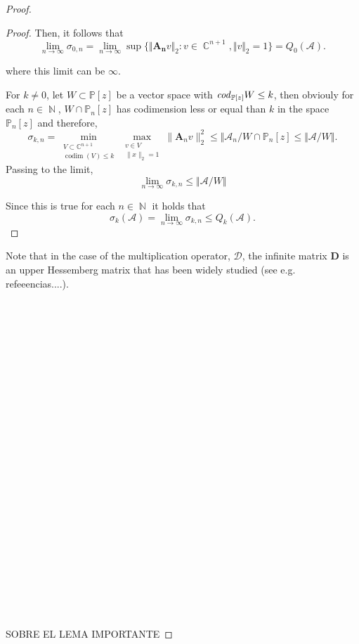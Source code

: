 \documentclass[12pt]{amsart}
\theoremstyle{definition}
\theoremstyle{plain}
\theoremstyle{remark}
\DeclareMathOperator{\CC}{\mathbb C}
\DeclareMathOperator{\NN}{\mathbb N}
\begin{document}
\begin{proof}
\begin{proof}
\noindent Then, it follows that 
$$
\lim_{n\to \infty} \sigma_{0,n}= 
\lim_{n\to \infty} \sup \{ \Vert \mathbf{A_n}v\Vert_2: v\in \CC^{n+1}, \Vert v \Vert_2=1\} =Q_0(\mathcal{A}). 
$$

\noindent where this limit can be $\infty$. 

\noindent For $k\neq 0$, let $W\subset \mathbb{P}[z]$ be a vector space with ${\it cod}_{\mathbb{P}[z]} W \leq k$, then obviouly for each $n\in \NN$, $W\cap \mathbb{P}_n[z]$ has codimension less or equal than $k$ in the space $\mathbb{P}_n[z]$ and therefore, 
$$
\sigma_{k,n} = \min_{\substack{V \subset \mathbb{C}^{n+1} \\ \operatorname{codim}(V) \leq  k}} \max_{\substack{v \in V \\ \|x\|_2 = 1}} \|\mathbf{A}_n v\|_2^2 \leq 
\Vert \mathcal{A}_n/W\cap \mathbb{P}_n[z] \leq \Vert \mathcal{A}/W \Vert.
$$
\noindent Passing to the limit, 
$$
\lim_{n\to \infty} \sigma_{k,n} \leq \Vert \mathcal{A}/W \Vert
$$

\noindent Since this is true for each $n\in \NN$ it holds that 
$$
\sigma_{k}(\mathcal{A}) =\lim_{n\to \infty} \sigma_{k,n} \leq Q_k(\mathcal{A}).
$$
\end{proof}


Note that in the case of the multiplication operator, $\mathcal{D}$, the infinite matrix $\mathbf{D}$ is an upper Hessemberg matrix that has been widely studied (see e.g. refeeencias....). 

\noindent

\\\\\\\\\\\\\\\\\\\\\\\\\\\\\\\\\\\\\\\\\\\\\

\noindent SOBRE EL LEMA IMPORTANTE 
    

\end{proof}
\end{document}
